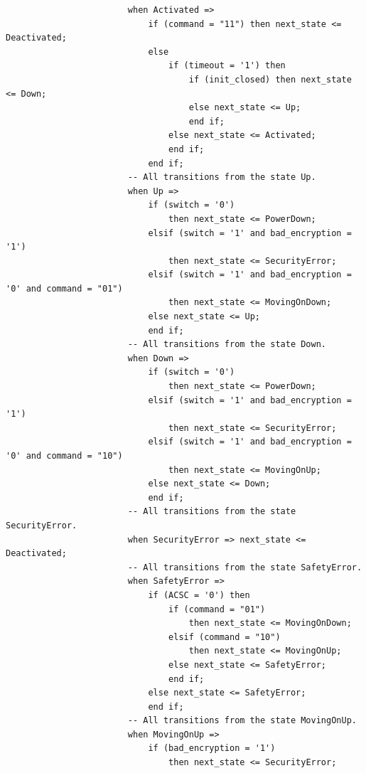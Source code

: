 \documentclass[a4paper,11pt]{article}
\begin{document}
\begin{verbatim}
                        when Activated =>
                            if (command = "11") then next_state <= Deactivated;
                            else
                                if (timeout = '1') then
                                    if (init_closed) then next_state <= Down;
			                        else next_state <= Up;
	                                end if;
                                else next_state <= Activated;
	                            end if;
	                        end if;
                        -- All transitions from the state Up.
                        when Up =>
                            if (switch = '0')
                                then next_state <= PowerDown;
                            elsif (switch = '1' and bad_encryption = '1')
                                then next_state <= SecurityError;
                            elsif (switch = '1' and bad_encryption = '0' and command = "01")
                                then next_state <= MovingOnDown;
                            else next_state <= Up;
	                        end if;
                        -- All transitions from the state Down.
                        when Down =>
                            if (switch = '0')
                                then next_state <= PowerDown;
                            elsif (switch = '1' and bad_encryption = '1')
                                then next_state <= SecurityError;
                            elsif (switch = '1' and bad_encryption = '0' and command = "10")
                                then next_state <= MovingOnUp;
                            else next_state <= Down;
	                        end if;
                        -- All transitions from the state SecurityError.
                        when SecurityError => next_state <= Deactivated;
                        -- All transitions from the state SafetyError.
                        when SafetyError =>
                            if (ACSC = '0') then
                                if (command = "01")
                                    then next_state <= MovingOnDown;
                                elsif (command = "10")
                                    then next_state <= MovingOnUp;
			                    else next_state <= SafetyError;
	                            end if;
                            else next_state <= SafetyError;
	                        end if;
                        -- All transitions from the state MovingOnUp.
                        when MovingOnUp =>
                            if (bad_encryption = '1')
                                then next_state <= SecurityError;

\end{verbatim}
\end{document}
